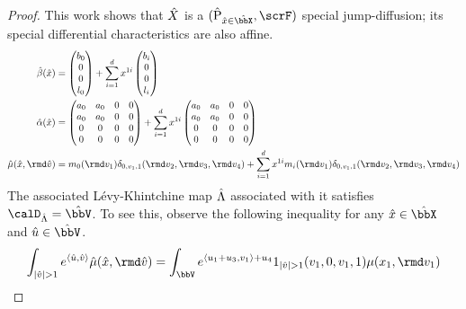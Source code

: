 \begin{proof}
  This work shows that $\hat{X}$ is a $(\hat\Prb_{\hat\stateVar\in\hat\stateSpace}, \scrF)$ special jump-diffusion; its special differential characteristics are also affine.
  \begin{align*}
    \hat\affDrift(\hat\stateVar) &= \begin{pmatrix} \affDriftPart_0 \\ 0 \\ 0 \\ \affIntPart_0 \end{pmatrix} + \sum_{i=1}^d \stateVar^{1i} \begin{pmatrix} \affDriftPart_i \\ 0 \\ 0 \\ \affIntPart_i \end{pmatrix} \\
    \hat\affDiff(\hat\stateVar) &=  \begin{pmatrix} \affDiffPart_0 & \affDiffPart_0 & 0 & 0 \\ \affDiffPart_0 & \affDiffPart_0 & 0 & 0 \\ 0 & 0 & 0 & 0 \\ 0 & 0 & 0 & 0 \end{pmatrix} + \sum_{i=1}^d \stateVar^{1i} \begin{pmatrix} \affDiffPart_0 & \affDiffPart_0 & 0 & 0 \\ \affDiffPart_0 & \affDiffPart_0 & 0 & 0 \\ 0 & 0 & 0 & 0 \\ 0 & 0 & 0 & 0 \end{pmatrix} \\
      \hat\affJump(\hat\stateVar, \rmd\hat\markVar) &= \affJumpPart_0(\rmd\markVar_1)\delta_{0,\markVar_1,1}(\rmd\markVar_2,\rmd\markVar_3,\rmd\markVar_4)+ \sum_{i=1}^d \stateVar^{1i}  \affJumpPart_i(\rmd\markVar_1)\delta_{0,\markVar_1,1}(\rmd\markVar_2, \rmd\markVar_3, \rmd\markVar_4)
  \end{align*}
  The associated L\'evy-Khintchine map $\hat{\Lambda}$ associated with it satisfies $\odeSpaceJoint = \hat\vecSpace$.
  To see this, observe the following inequality for any $\hat\stateVar \in \hat\stateSpace$ and $\hat\momentVar \in \hat\vecSpace$.
  \begin{align*}
    \int_{|\hat\markVar|>1} e^\prj{\hat\momentVar}{\hat\markVar} \hat\affJump(\hat\stateVar, \rmd\hat\markVar)
    &= \int_\vecSpace e^{\prj{\momentVar_1+\momentVar_3}{\markVar_1} + \momentVar_4} 1_{|\hat\markVar|>1}(\markVar_1, 0, \markVar_1, 1) \affJump(\stateVar_1,\rmd\markVar_1) \\

\end{align*}
\end{proof}
